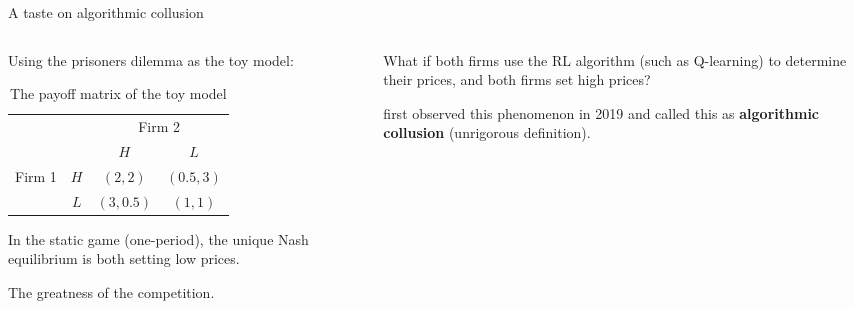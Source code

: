 \documentclass[8pt]{beamer}
\begin{document}
\begin{frame}{A taste on algorithmic collusion}
    \begin{columns}
        \begin{column}{0.48\textwidth}
            Using the prisoners dilemma as the toy model:
            \begin{table}[htbp]
                \centering
                \caption{The payoff matrix of the toy model}
                \label{tab:toy_payoff_matrix}
                \begin{tabular}{cc|c|c}
                    & & \multicolumn{2}{c}{Firm 2} \\
                    & & $H$ & $L$ \\
                    \hline
                    \multirow{2}{*}{Firm 1} & $H$ & $(2,2)$ & $(0.5,3)$ \\
                    \cline{2-4}
                    & $L$ & $(3,0.5)$ & $(1,1)$ \\
                \end{tabular}
            \end{table}
            \vspace{0.5cm}
            In the static game (one-period), the unique Nash equilibrium is both setting low prices.
            \vspace{0.5cm}
            \begin{center}
                The greatness of the competition.
            \end{center}
        \end{column}
        \begin{column}{0.48\textwidth}
            What if both firms use the RL algorithm (such as Q-learning) to determine their prices, and both firms set high prices? 
            \vspace{1cm}
            
            \cite{calvano2019algorithmic} first observed this phenomenon in 2019 and called this as \textbf{algorithmic collusion} (unrigorous definition).
        \end{column}
    \end{columns}
\end{frame}
\end{document}
